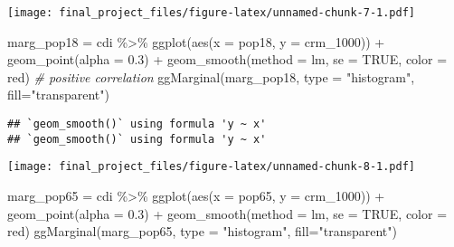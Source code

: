 \documentclass[
]{article}
\newenvironment{Shaded}{\begin{snugshade}}{\end{snugshade}}
\newcommand{\AttributeTok}[1]{\textcolor[rgb]{0.77,0.63,0.00}{#1}}
\newcommand{\CommentTok}[1]{\textcolor[rgb]{0.56,0.35,0.01}{\textit{#1}}}
\newcommand{\ConstantTok}[1]{\textcolor[rgb]{0.00,0.00,0.00}{#1}}
\newcommand{\FloatTok}[1]{\textcolor[rgb]{0.00,0.00,0.81}{#1}}
\newcommand{\FunctionTok}[1]{\textcolor[rgb]{0.00,0.00,0.00}{#1}}
\newcommand{\NormalTok}[1]{#1}
\newcommand{\OtherTok}[1]{\textcolor[rgb]{0.56,0.35,0.01}{#1}}
\newcommand{\SpecialCharTok}[1]{\textcolor[rgb]{0.00,0.00,0.00}{#1}}
\newcommand{\StringTok}[1]{\textcolor[rgb]{0.31,0.60,0.02}{#1}}
\begin{document}
\texttt{[image: final\_project\_files/figure-latex/unnamed-chunk-7-1.pdf]}

\begin{Shaded}
\begin{Highlighting}[]
\NormalTok{marg\_pop18 }\OtherTok{=}\NormalTok{ cdi }\SpecialCharTok{\%\textgreater{}\%} \FunctionTok{ggplot}\NormalTok{(}\FunctionTok{aes}\NormalTok{(}\AttributeTok{x =}\NormalTok{ pop18, }\AttributeTok{y =}\NormalTok{ crm\_1000)) }\SpecialCharTok{+} \FunctionTok{geom\_point}\NormalTok{(}\AttributeTok{alpha =} \FloatTok{0.3}\NormalTok{) }\SpecialCharTok{+} \FunctionTok{geom\_smooth}\NormalTok{(}\AttributeTok{method =} \StringTok{\textquotesingle{}lm\textquotesingle{}}\NormalTok{, }\AttributeTok{se =} \ConstantTok{TRUE}\NormalTok{, }\AttributeTok{color =} \StringTok{\textquotesingle{}red\textquotesingle{}}\NormalTok{)}
\CommentTok{\# positive correlation}
\FunctionTok{ggMarginal}\NormalTok{(marg\_pop18, }\AttributeTok{type =} \StringTok{"histogram"}\NormalTok{, }\AttributeTok{fill=}\StringTok{"transparent"}\NormalTok{)}
\end{Highlighting}
\end{Shaded}

\begin{verbatim}
## `geom_smooth()` using formula 'y ~ x'
## `geom_smooth()` using formula 'y ~ x'
\end{verbatim}

\texttt{[image: final\_project\_files/figure-latex/unnamed-chunk-8-1.pdf]}

\begin{Shaded}
\begin{Highlighting}[]
\NormalTok{marg\_pop65 }\OtherTok{=}\NormalTok{ cdi }\SpecialCharTok{\%\textgreater{}\%} \FunctionTok{ggplot}\NormalTok{(}\FunctionTok{aes}\NormalTok{(}\AttributeTok{x =}\NormalTok{ pop65, }\AttributeTok{y =}\NormalTok{ crm\_1000)) }\SpecialCharTok{+} \FunctionTok{geom\_point}\NormalTok{(}\AttributeTok{alpha =} \FloatTok{0.3}\NormalTok{) }\SpecialCharTok{+} \FunctionTok{geom\_smooth}\NormalTok{(}\AttributeTok{method =} \StringTok{\textquotesingle{}lm\textquotesingle{}}\NormalTok{, }\AttributeTok{se =} \ConstantTok{TRUE}\NormalTok{, }\AttributeTok{color =} \StringTok{\textquotesingle{}red\textquotesingle{}}\NormalTok{)}
\FunctionTok{ggMarginal}\NormalTok{(marg\_pop65, }\AttributeTok{type =} \StringTok{"histogram"}\NormalTok{, }\AttributeTok{fill=}\StringTok{"transparent"}\NormalTok{)}
\end{Highlighting}
\end{Shaded}
\end{document}
